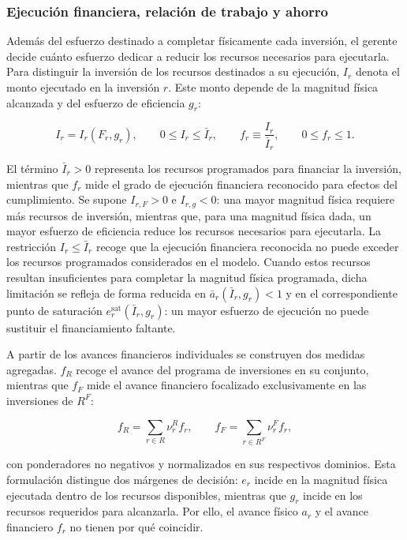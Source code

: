 \subsubsection{Ejecución financiera, relación de trabajo y ahorro}

Además del esfuerzo destinado a completar físicamente cada inversión, el gerente decide cuánto esfuerzo dedicar a reducir los recursos necesarios para ejecutarla. Para distinguir la inversión de los recursos destinados a su ejecución, \(I_r\) denota el monto ejecutado en la inversión \(r\). Este monto depende de la magnitud física alcanzada y del esfuerzo de eficiencia \(g_r\):

\begin{equation}
\label{eq:inversion_ejecutada}
I_r
=
I_r(F_r,g_r),
\qquad
0\leq I_r\leq\bar I_r,
\qquad
f_r
\equiv
\frac{I_r}{\bar I_r},
\qquad
0\leq f_r\leq1.
\end{equation}

El término \(\bar I_r>0\) representa los recursos programados para financiar la inversión, mientras que \(f_r\) mide el grado de ejecución financiera reconocido para efectos del cumplimiento. Se supone \(I_{r,F}>0\) e \(I_{r,g}<0\): una mayor magnitud física requiere más recursos de inversión, mientras que, para una magnitud física dada, un mayor esfuerzo de eficiencia reduce los recursos necesarios para ejecutarla. La restricción \(I_r\leq\bar I_r\) recoge que la ejecución financiera reconocida no puede exceder los recursos programados considerados en el modelo. Cuando estos recursos resultan insuficientes para completar la magnitud física programada, dicha limitación se refleja de forma reducida en \(\bar a_r(\bar I_r,g_r)<1\) y en el correspondiente punto de saturación \(e_r^{\mathrm{sat}}(\bar I_r,g_r)\): un mayor esfuerzo de ejecución no puede sustituir el financiamiento faltante.

A partir de los avances financieros individuales se construyen dos medidas agregadas. \(f_R\) recoge el avance del programa de inversiones en su conjunto, mientras que \(f_F\) mide el avance financiero focalizado exclusivamente en las inversiones de \(R^{F}\):

\begin{equation}
\label{eq:avance_financiero_agregado}
f_R
=
\sum_{r\in R}
\nu_r^{R}f_r,
\qquad
f_F
=
\sum_{r\in R^{F}}
\nu_r^{F}f_r,
\end{equation}

con ponderadores no negativos y normalizados en sus respectivos dominios. Esta formulación distingue dos márgenes de decisión: \(e_r\) incide en la magnitud física ejecutada dentro de los recursos disponibles, mientras que \(g_r\) incide en los recursos requeridos para alcanzarla. Por ello, el avance físico \(a_r\) y el avance financiero \(f_r\) no tienen por qué coincidir.

